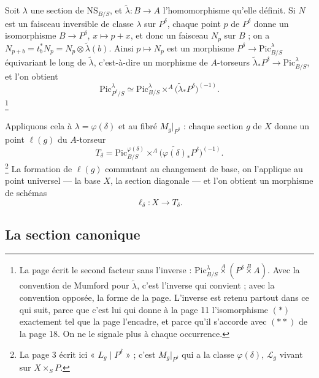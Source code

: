\documentclass[11pt,a4paper]{article}
\begin{document}
Soit $\lambda$ une section de $\mathrm{NS}_{B/S}$, et $\tilde{\lambda} : B \to
A$ l'homomorphisme qu'elle définit. Si $N$ est un faisceau inversible de classe
$\lambda$ sur $P^{\delta}$, chaque point $p$ de $P^{\delta}$ donne un
isomorphisme $B \to P^{\delta}$, $x \mapsto p + x$, et donc un faisceau $N_p$
sur $B$ ; on a $N_{p+b} = t_b^{*}N_p = N_p \otimes \tilde{\lambda}(b)$. Ainsi
$p \mapsto N_p$ est un morphisme $P^{\delta} \to \mathrm{Pic}^{\lambda}_{B/S}$
équivariant le long de $\tilde{\lambda}$, c'est-à-dire un morphisme de
$A$-torseurs $\tilde{\lambda}_{*}P^{\delta} \to \mathrm{Pic}^{\lambda}_{B/S}$,
et l'on obtient
\[
\mathrm{Pic}^{\lambda}_{P^{\delta}/S} \simeq
\mathrm{Pic}^{\lambda}_{B/S} \times^{A} \bigl(\tilde{\lambda}_{*}P^{\delta}\bigr)^{(-1)} .
\]
\footnote{La page écrit le second facteur sans l'inverse :
$\mathrm{Pic}^{\lambda}_{B/S} \overset{A}{\times} (P^{\delta}
\overset{B}{\times} A)$. Avec la convention de Mumford pour $\tilde{\lambda}$,
c'est l'inverse qui convient ; avec la convention opposée, la forme de la page.
L'inverse est retenu partout dans ce qui suit, parce que c'est lui qui donne à
la page 11 l'isomorphisme $(*)$ exactement tel que la page l'encadre, et parce
qu'il s'accorde avec $(**)$ de la page 18. On ne le signale plus à chaque
occurrence.}

Appliquons cela à $\lambda = \varphi(\delta)$ et au fibré $M_g|_{P^{\delta}}$ :
chaque section $g$ de $X$ donne un point $\ell(g)$ du $A$-torseur
\[
T_{\delta} = \mathrm{Pic}^{\varphi(\delta)}_{B/S} \times^{A}
\bigl(\widetilde{\varphi(\delta)}_{*}P^{\delta}\bigr)^{(-1)} .
\]
\footnote{La page 3 écrit ici « $L_g \mid P^{\delta}$ » ; c'est
$M_g|_{P^{\delta}}$ qui a la classe $\varphi(\delta)$, $\mathcal{L}_g$ vivant
sur $X \times_S P$.} La formation de $\ell(g)$ commutant au changement de base,
on l'applique au point universel — la base $X$, la section diagonale — et l'on
obtient un morphisme de schémas
\[
\ell_{\delta} : X \longrightarrow T_{\delta}.
\]

\subsection*{La section canonique}
\end{document}
